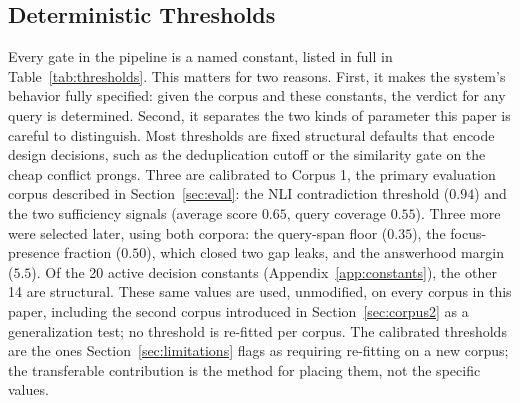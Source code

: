 \documentclass[conference]{IEEEtran}
\begin{document}
\subsection{Deterministic Thresholds}
Every gate in the pipeline is a named constant, listed in full in
Table~\ref{tab:thresholds}. This matters for two reasons. First, it makes
the system's behavior fully specified: given the corpus and these
constants, the verdict for any query is determined. Second, it separates
the two kinds of parameter this paper is careful to distinguish. Most
thresholds are fixed structural defaults that encode design decisions, such
as the deduplication cutoff or the similarity gate on the cheap conflict
prongs. Three are calibrated to Corpus 1, the primary evaluation corpus
described in Section~\ref{sec:eval}: the NLI contradiction threshold
($0.94$) and the two sufficiency signals (average score $0.65$, query
coverage $0.55$). Three more were selected later, using both corpora: the
query-span floor ($0.35$), the focus-presence fraction ($0.50$), which
closed two gap leaks, and the answerhood margin ($5.5$). Of the 20 active
decision constants (Appendix~\ref{app:constants}), the other 14 are
structural. These same values are used, unmodified, on every corpus in
this paper, including the second corpus introduced in
Section~\ref{sec:corpus2} as a generalization test; no threshold is
re-fitted per corpus. The calibrated thresholds are the ones
Section~\ref{sec:limitations} flags as requiring re-fitting on a new
corpus; the transferable contribution is the method for placing them, not
the specific values.
\end{document}
